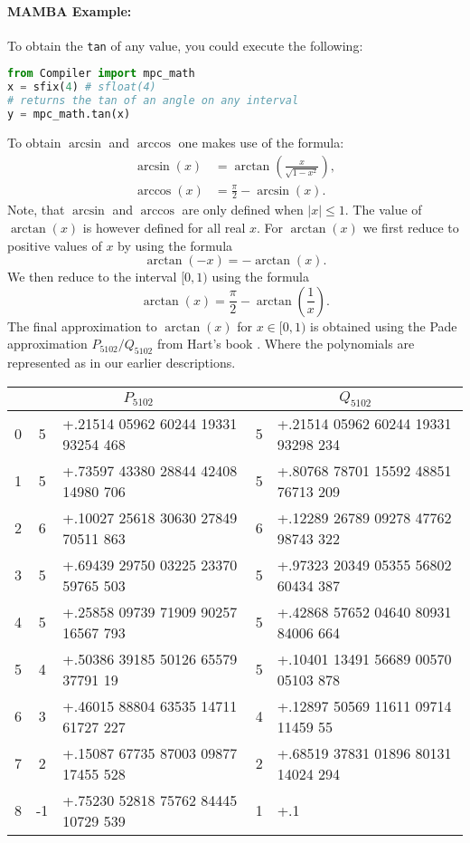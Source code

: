 \paragraph{MAMBA Example:} To obtain the \verb|tan| of any value, you could execute the following:
\begin{lstlisting}[language={python}]
from Compiler import mpc_math
x = sfix(4) # sfloat(4)
# returns the tan of an angle on any interval
y = mpc_math.tan(x)
\end{lstlisting}

To obtain  $\arcsin$ and $\arccos$ one makes use of the formula:
\begin{align*}
 \arcsin (x) &= \arctan \left( \frac{x}{\sqrt{1-x^2}} \right), \\
 \arccos (x) &= \frac{\pi}{2} - \arcsin (x). 
\end{align*}
Note, that $\arcsin$ and $\arccos$ are only defined when 
$|x|\le 1$.
The value of $\arctan(x)$ is however defined for all real $x$.
For $\arctan(x)$ we first reduce to positive values of $x$ by using the formula
\[ \arctan(-x) = - \arctan(x). \]
We then reduce to the interval $[0,1)$ using the formula
\[ \arctan(x) = \frac{\pi}{2} - \arctan\left(\frac{1}{x} \right). \]
The final approximation to $\arctan(x)$ for $x \in [0,1)$
is obtained using the Pade approximation $P_{5102}/Q_{5102}$
from Hart's book \cite{Hart:1978:CA:540084}.
Where the polynomials are represented as in our earlier 
descriptions.
\begin{center}
\begin{tabular}{|c||c|l||c|l|}
\hline
& \multicolumn{2}{c||}{$P_{5102}$} & \multicolumn{2}{c|}{$Q_{5102}$}  \\
\hline
0  &  5  & +.21514 05962 60244 19331 93254 468 & 5 & +.21514 05962 60244 19331 93298 234 \\
1  &  5  & +.73597 43380 28844 42408 14980 706 & 5 & +.80768 78701 15592 48851 76713 209 \\
2  &  6  & +.10027 25618 30630 27849 70511 863 & 6 & +.12289 26789 09278 47762 98743 322 \\ 
3  &  5  & +.69439 29750 03225 23370 59765 503 & 5 & +.97323 20349 05355 56802 60434 387 \\
4  &  5  & +.25858 09739 71909 90257 16567 793 & 5 & +.42868 57652 04640 80931 84006 664 \\ 
5  &  4  & +.50386 39185 50126 65579 37791 19  & 5 & +.10401 13491 56689 00570 05103 878 \\ 
6  &  3  & +.46015 88804 63535 14711 61727 227 & 4 & +.12897 50569 11611 09714 11459 55  \\ 
7  &  2  & +.15087 67735 87003 09877 17455 528 & 2 & +.68519 37831 01896 80131 14024 294 \\
8  & -1  & +.75230 52818 75762 84445 10729 539 & 1 & +.1 \\
\hline
\end{tabular}
\end{center}

